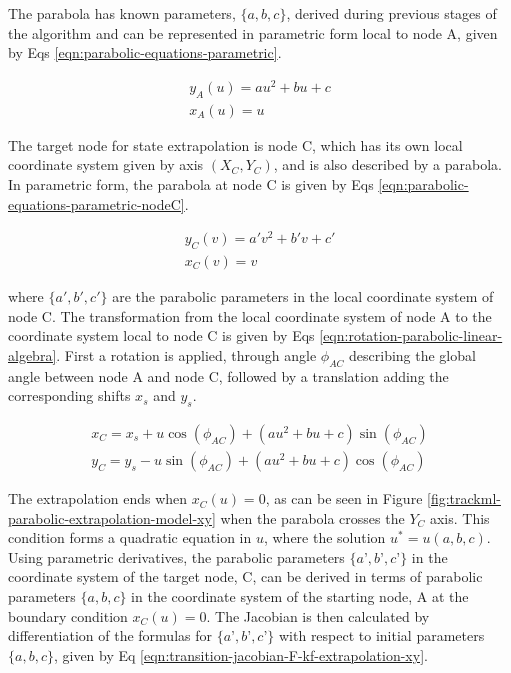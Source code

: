 The parabola has known parameters, $\{a, b, c\}$, derived during previous stages of the algorithm and can be represented in parametric form local to node A, given by Eqs \eqref{eqn:parabolic-equations-parametric}.

\begin{equation}
\begin{aligned}
y_A(u) = au^{2} + bu + c \\
x_A(u) = u
\end{aligned}
\label{eqn:parabolic-equations-parametric}
\end{equation}

The target node for state extrapolation is node C, which has its own local coordinate system given by axis $(X_C, Y_C)$, and is also described by a parabola. In parametric form, the parabola at node C is given by Eqs \eqref{eqn:parabolic-equations-parametric-nodeC}.

\begin{equation}
\begin{aligned}
y_C(v) = a'v^{2} + b'v + c' \\
x_C(v) = v
\end{aligned}
\label{eqn:parabolic-equations-parametric-nodeC}
\end{equation}

where $\{a', b', c' \}$ are the parabolic parameters in the local coordinate system of node C. The transformation from the local coordinate system of node A to the coordinate system local to node C is given by Eqs \eqref{eqn:rotation-parabolic-linear-algebra}. First a rotation is applied, through angle $\phi_{AC}$ describing the global angle between node A and node C, followed by a translation adding the corresponding shifts $x_s$ and $y_s$.

\begin{equation}
\begin{aligned}
x_C = x_s + u\cos(\phi_{AC}) + (au^2 + bu + c)\sin(\phi_{AC}) \\
y_C = y_s - u\sin(\phi_{AC}) + (au^2 + bu + c)\cos(\phi_{AC})
\end{aligned}
\label{eqn:rotation-parabolic-linear-algebra}
\end{equation}


The extrapolation ends when $x_{C}(u) = 0$, as can be seen in Figure \ref{fig:trackml-parabolic-extrapolation-model-xy} when the parabola crosses the $Y_C$ axis. This condition forms a quadratic equation in $u$, where the solution $u^{*} = u(a, b, c)$. Using parametric derivatives, the parabolic parameters $\{a’, b’, c’ \}$ in the coordinate system of the target node, C, can be derived in terms of parabolic parameters $\{a, b, c \}$ in the coordinate system of the starting node, A at the boundary condition $x_{C}(u) = 0$. The Jacobian is then calculated by differentiation of the formulas for $\{a’, b’, c’ \}$ with respect to initial parameters $\{a, b, c \}$, given by Eq \eqref{eqn:transition-jacobian-F-kf-extrapolation-xy}.  

